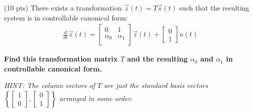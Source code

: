 \begin{enumerate}

\qitem (10 pts)
There exists a transformation $\vec{z}(t) = T\vec{s}(t)$ such that the
resulting system is in controllable canonical form: 
\begin{align*}
\frac{d}{dt}\vec{z}(t) 
= \begin{bmatrix}
 0 & 1 \\
 \alpha_0 & \alpha_1 \\
\end{bmatrix} 
\vec{z}(t) +
\begin{bmatrix}
0 \\ 1 
\end{bmatrix}
u(t)
\end{align*}

{\bf Find this transformation matrix $T$ and the resulting $\alpha_0$
  and $\alpha_1$ in controllable canonical form.}

{\em HINT:
The column vectors of $T$ are just the standard basis vectors
$\left\{
\begin{bmatrix}
1 \\ 0 
\end{bmatrix},
\begin{bmatrix}
0 \\ 1 
\end{bmatrix}
\right\}
$
arranged in some order.
}

\end{enumerate}
